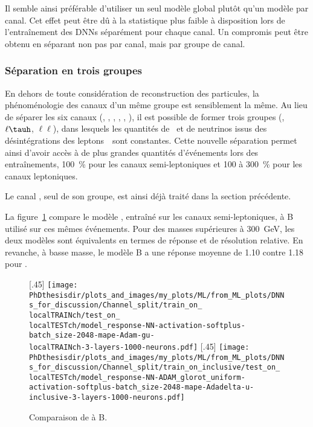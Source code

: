 \par
Il semble ainsi préférable d'utiliser un seul modèle global plutôt qu'un modèle par canal.
Cet effet peut être dû à la statistique plus faible à disposition lors de l'entraînement des DNNs séparément pour chaque canal.
Un compromis peut être obtenu en séparant non pas par canal, mais par groupe de canal.
\subsubsection{Séparation en trois groupes}
En dehors de toute considération de reconstruction des particules,
la phénoménologie des canaux d'un même groupe
est sensiblement la même.
Au lieu de séparer les six canaux (\tauh\tauh, \mu\tauh, \ele\tauh, \mu\mu, \ele\mu, \ele\ele),
il est possible de former trois groupes (\tauh\tauh, $\ell\tauh$, $\ell\ell$),
dans lesquels les quantités de \tauh\ et de neutrinos issus des désintégrations des leptons~\tau\ sont constantes.
Cette nouvelle séparation permet ainsi d'avoir accès à de plus grandes quantités d'événements lors des entraînements,
\SI{+100}{\%} pour les canaux semi-leptoniques et \num{+100} à \SI{+300}{\%} pour les canaux leptoniques.
\par
Le canal \tauh\tauh, seul de son groupe, est ainsi déjà traité dans la section précédente.
\par
La figure~\ref{fig-lt} compare le modèle
, entraîné sur les canaux semi-leptoniques,
à B utilisé sur ces mêmes événements.
Pour des masses supérieures à \SI{300}{\GeV},
les deux modèles sont équivalents en termes de réponse et de résolution relative.
En revanche, à basse masse, le modèle B a une réponse moyenne de \num{1.10} contre \num{1.18} pour .
\begin{figure}[h]
\centering

\def\localTRAINch{lt}
\def\localTESTch{lt}
\subcaptionbox{Modèle \Bchsplit{\localTRAINch} testé sur \GetChannelStr{\localTESTch}.\label{subfig-reponse_model_train_on_\localTRAINch_test_on_\localTESTch}}[.45\textwidth]
{\texttt{[image: \\PhDthesisdir/plots\_and\_images/my\_plots/ML/from\_ML\_plots/DNNs\_for\_discussion/Channel\_split/train\_on\_\\localTRAINch/test\_on\_\\localTESTch/model\_response-NN-activation-softplus-batch\_size-2048-mape-Adam-gu-\\localTRAINch-3-layers-1000-neurons.pdf]}\vspace{-.5\baselineskip}}
\hfill
\subcaptionbox{Modèle B testé sur \GetChannelStr{\localTESTch}.\label{subfig-reponse_model_train_on_inclusive_test_on_\localTESTch}}[.45\textwidth]
{\texttt{[image: \\PhDthesisdir/plots\_and\_images/my\_plots/ML/from\_ML\_plots/DNNs\_for\_discussion/Channel\_split/train\_on\_inclusive/test\_on\_\\localTESTch/model\_response-NN-ADAM\_glorot\_uniform-activation-softplus-batch\_size-2048-mape-Adadelta-u-inclusive-3-layers-1000-neurons.pdf]}\vspace{-.5\baselineskip}}

\caption[Comparaison du modèle entraîné sur les canaux semi-leptoniques au modèle B.]{Comparaison de  à B.}
\label{fig-lt}
\end{figure}
